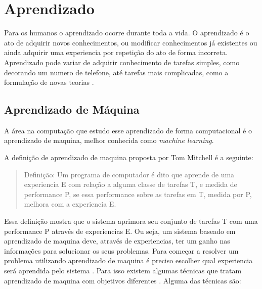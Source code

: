 \section{Aprendizado} 
Para os humanos o aprendizado ocorre durante toda a vida. 
O aprendizado é o ato de adquirir novos conhecimentos, ou modificar conhecimentos já existentes ou ainda adquirir uma experiencia por repetição do ato de forma incorreta. 
Aprendizado pode variar de adquirir conhecimento de tarefas simples, como decorando um numero de telefone, até tarefas mais complicadas, como a formulação de novas teorias \cite{intelligence2003modern}. 

\subsection{Aprendizado de Máquina} 

A área na computação que estudo esse aprendizado de forma computacional é o aprendizado de maquina, melhor conhecida como \textit{machine learning}. 


A definição de aprendizado de maquina proposta por Tom Mitchell \cite{Mitchell1997ML} é a seguinte:

 \begin{quote}
 	Definição: Um programa de computador é dito que aprende de uma experiencia E com relação a alguma classe de tarefas T, e medida de performance P, se essa performance sobre as tarefas em T, medida por P, melhora com a experiencia E.
 \end{quote}

Essa definição mostra que o sistema aprimora seu conjunto de tarefas T com uma performance P através de experiencias E. Ou seja, um sistema baseado em aprendizado de maquina deve, através de experiencias, ter um ganho nas informações para solucionar os seus problemas. Para começar a resolver um problema utilizando aprendizado de maquina é preciso escolher qual experiencia será aprendida pelo sistema \cite{Mitchell1997ML}. Para isso existem algumas técnicas que tratam aprendizado de maquina com objetivos diferentes \cite{intelligence2003modern}. Alguma das técnicas são: %

